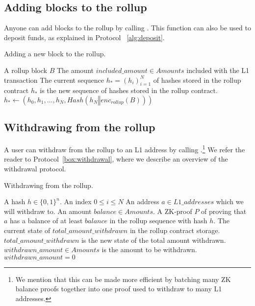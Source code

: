 \subsection{Adding blocks to the rollup}

Anyone can add blocks to the rollup by calling . This function can also be used to deposit funds, as explained in Protocol ~\ref{alg:deposit}.

\begin{contractfunction}[H]
\caption{Adding a new block to the rollup.}\label{alg:adding-blocks}
\begin{algorithmic}[1]
\Require 
\Statex A rollup block \(B\)
\Statex The amount \(included\_amount \in Amounts\) included with the L1 transaction
\Statex The current sequence \(h_* = (h_i)_{i=1}^N\) of hashes stored in the rollup contract
\Ensure \(h_*\) is the new sequence of hashes stored in the rollup contract.
  \State \(h_* \gets (h_0, h_1, \dots, h_N, Hash(h_N \mathbin\Vert enc_{rollup}(B)))\)
\EndIf
\end{algorithmic}
\end{contractfunction}



\subsection{Withdrawing from the rollup}

A user can withdraw from the rollup to an L1 address by calling .\footnote{We mention that this can be made more efficient by batching many ZK balance proofs together into one proof used to withdraw to many L1 addresses.} We refer the reader to Protocol~\ref{box:withdrawal}, where we describe an overview of the withdrawal protocol.

\begin{contractfunction}[H]
\caption{Withdrawing from the rollup.}\label{alg:withdrawing}
\begin{algorithmic}[1]
\Require 
\Statex A hash \(h \in \{0,1\}^n\).
\Statex An index \(0 \leq i \leq N\)
\Statex An address \(a \in L1\_addresses\) which we will withdraw to.
\Statex An amount \(balance \in Amounts\).
\Statex A ZK-proof \(P\) of  proving that \(a\) has a balance of at least \(balance\) in the rollup sequence with hash \(h\).
\Statex The current state of \(total\_amount\_withdrawn\) in the rollup contract storage.
\Ensure
\Statex \(total\_amount\_withdrawn\) is the new state of the total amount withdrawn.
\Statex \(withdrawn\_amount \in Amounts\) is the amount to be withdrawn.
\Else
  \State \(withdrawn\_amount = 0\)
\EndIf
{}
\end{algorithmic}
\end{contractfunction}

